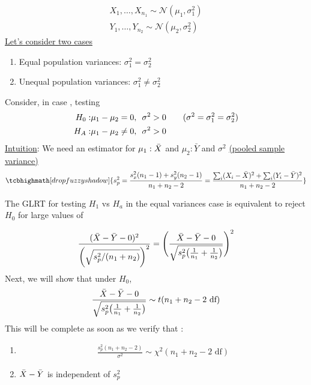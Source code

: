 \begin{gather*}
	X_1, \ldots, X_{n_1} \sim \mathcal{N}(\mu_1, \sigma^2_1)\\
	Y_1, \ldots, Y_{n_2} \sim \mathcal{N}(\mu_2, \sigma^2_2)
\end{gather*}
\underline{Let's consider two cases}
\begin{enumerate}[label=\protect\circled{\Roman*}]
	\item Equal population variances: $\sigma^2_1 = \sigma^2_2$
	\item Unequal population variances: $\sigma^2_1 \neq \sigma^2_2$
\end{enumerate}
Consider, in case , testing 
\begin{align*}
	H_0: & \mu_1 - \mu_2 = 0, \hspace{0.5em} \sigma^2 > 0 \qquad (\sigma^2 = \sigma^2_1 = \sigma^2_2)\\
	H_A: & \mu_1 - \mu_2 \neq 0, \hspace{0.5em} \sigma^2 > 0 
\end{align*}
\underline{Intuition}: We need an estimator for $\mu_1: \bar{X}$ and $\mu_2: \bar{Y}$ and $\sigma^2$ \underline{(pooled sample variance)}
\begin{gather*}
	\tcbhighmath[drop fuzzy shadow]{s^2_p = \frac{s^2_x (n_1 - 1) + s^2_y(n_2-1)}{n_1 + n_2 -2} = \frac{\sum_i (X_i - \bX)^2 + \sum_i (Y_i - \bar{Y})^2}{n_1 + n_2 -2}}
\end{gather*}
\begin{claim-N}
	The GLRT for testing $H_1$ vs $H_a$ in the equal variances case is equivalent to reject $H_0$ for large values of
\end{claim-N}
\begin{gather*}
	\frac{(\bar{X} - \bar{Y} - 0)^2}{\bigg( \sqrt{s^2_p / (n_1 + n_2)}\bigg)^2} = \Bigg(\frac{\bar{X} - \bar{Y} - 0}{\sqrt{s_p^2 \big(\frac{1}{n_1} + \frac{1}{n_2} \big)}} \Bigg)^2
\end{gather*}
Next, we will show that under $H_0$, 
\begin{gather*}
	\frac{\bar{X} - \bar{Y} - 0}{\sqrt{s_p^2 \big(\frac{1}{n_1} + \frac{1}{n_2} \big)}} \sim t(n_1 + n_2 - 2 \text{ df})
\end{gather*}
This will be complete as soon as we verify that :
\begin{enumerate}[label=\protect\circled{\Roman*}]
	\item 
	\begin{gather*}
		\frac{s_p^2 (n_1 + n_2 - 2)}{\sigma^2}\sim \chi^2(n_1 +n_2 - 2 \text{ df})
	\end{gather*}
	\item 		$\bar{X} - \bar{Y}$ is independent of $s_p^2$
\end{enumerate}
